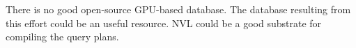\documentclass[11pt,twoside,a4paper]{article}
\begin{document}
There is no good open-source GPU-based database. The database resulting from
this effort could be an useful resource. NVL could be a good substrate for
compiling the query plans.








\end{document}
